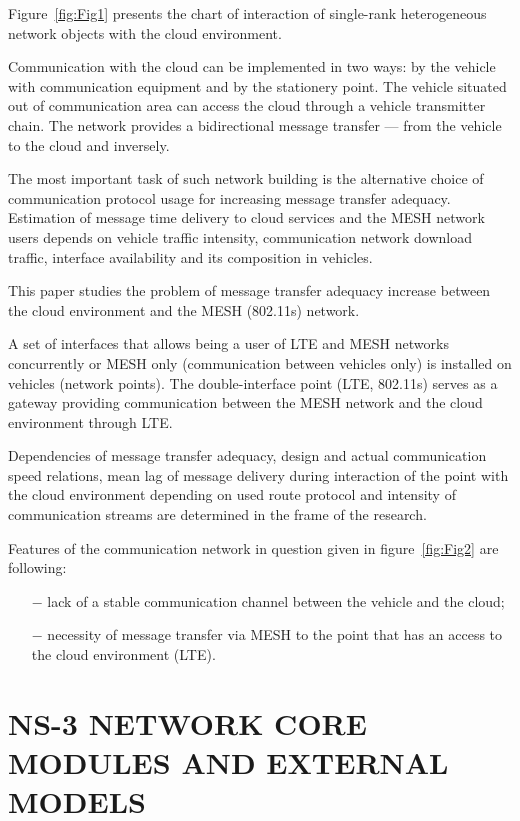 \documentclass[a4paper,twoside]{article}
\begin{document}
Figure~\ref{fig:Fig1} presents the chart of interaction of single-rank heterogeneous network objects with the cloud environment.

Communication with the cloud can be implemented in two ways: by the vehicle with communication equipment and by the stationery point. The vehicle situated out of communication area can access the cloud through a vehicle transmitter chain. The network provides a bidirectional message transfer --- from the vehicle to the cloud and inversely.

The most important task of such network building is the alternative choice of communication protocol usage for increasing message transfer adequacy. Estimation of message time delivery to cloud services and the MESH network users depends on vehicle traffic intensity, communication network download traffic, interface availability and its composition in vehicles.

This paper studies the problem of message transfer adequacy increase between the cloud environment and the MESH (802.11s) network.

A set of interfaces that allows being a user of LTE and MESH networks concurrently or MESH only (communication between vehicles only) is installed on vehicles (network points). The double-interface point (LTE, 802.11s) serves as a gateway providing communication between the MESH network and the cloud environment through LTE.

Dependencies of message transfer adequacy, design and actual communication speed relations, mean lag of message delivery during interaction of the point with the cloud environment depending on used route protocol and intensity of communication streams are determined in the frame of the research.

Features of the communication network in question given in figure~\ref{fig:Fig2} are following:

\begin{itemize}
\item[$-$] lack of a stable communication channel between the vehicle and the cloud;
\item[$-$] necessity of message transfer via MESH to the point that has an access to the cloud environment (LTE).
\end{itemize}

\section{NS-3 NETWORK CORE MODULES AND EXTERNAL MODELS}
\end{document}
